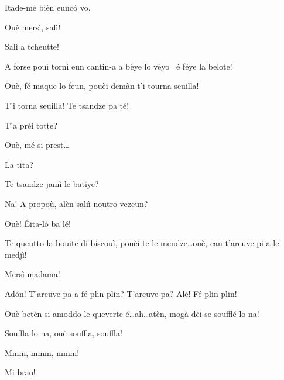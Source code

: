 \begin{drama}
\MedMitchospeaks{} Itade-mé bièn eunc\'o vo.

\Casimirspeaks Ouè mersì, salì!

\MedMitchospeaks{} Salì  a tcheutte!


\Casimirspeaks A forse pouì tornì eun cantin-a a bèye lo vèyo \bicchiererosso\ é  féye la belote!

\Gerominespeaks Ouè, fé maque lo feun, pouèi demàn t'i tourna seuilla!

\Casimirspeaks{} T'i torna seuilla! Te tsandze pa té!


\Gerominespeaks T'a prèi totte?

\Casimirspeaks Ouè, mé si prest\ldots

\Gerominespeaks La tita?

\Casimirspeaks Te tsandze jamì le batiye?

\Gerominespeaks {} Na! A propoù, alèn saliì noutro vezeun?

\Casimirspeaks Ouè! \'Eita-l\'o ba lé!


\Gerominespeaks{} Te queutto la bouite di biscouì, pouèi te le meudze\ldots ouè, can t'areuve pi a le medjì!


\Eunfeurmispeaks Mersì madama!

\Casimirspeaks{} Ad\'on! T'areuve pa a fé plin plin?  T'areuve pa? Alé! Fé plin plin!

\Gerominespeaks{} Ouè betèn si a\-mod\-do le queverte é\ldots ah\ldots atèn, mogà dèi se soufflé lo na!


\Gerominespeaks Souffla lo na, ouè souffla, souffla!


\PersEmpourtantaspeaks Mmm, mmm, mmm! 

\Gerominespeaks Mi brao!


\end{drama}
